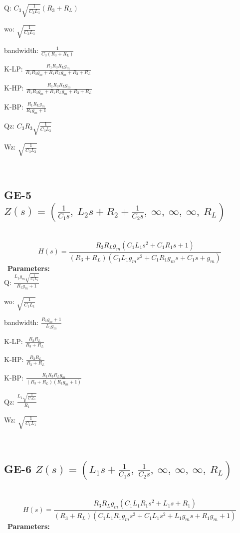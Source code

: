 \documentclass{article}
\begin{document}
Q: $C_{3} \sqrt{\frac{1}{C_{3} L_{3}}} \left(R_{3} + R_{L}\right)$\ 

wo: $\sqrt{\frac{1}{C_{3} L_{3}}}$\ 

bandwidth: $\frac{1}{C_{3} \left(R_{3} + R_{L}\right)}$\ 

K-LP: $\frac{R_{1} R_{3} R_{L} g_{m}}{R_{1} R_{3} g_{m} + R_{1} R_{L} g_{m} + R_{3} + R_{L}}$\ 

K-HP: $\frac{R_{1} R_{3} R_{L} g_{m}}{R_{1} R_{3} g_{m} + R_{1} R_{L} g_{m} + R_{3} + R_{L}}$\ 

K-BP: $\frac{R_{1} R_{L} g_{m}}{R_{1} g_{m} + 1}$\ 

Qz: $C_{3} R_{3} \sqrt{\frac{1}{C_{3} L_{3}}}$\ 

Wz: $\sqrt{\frac{1}{C_{3} L_{3}}}$\ 

\ 

\subsection{GE-5 $Z(s) = \left( \frac{1}{C_{1} s}, \  L_{2} s + R_{2} + \frac{1}{C_{2} s}, \  \infty, \  \infty, \  \infty, \  R_{L}\right)$ } \ 
\textbf{\[H(s) = \frac{R_{3} R_{L} g_{m} \left(C_{1} L_{1} s^{2} + C_{1} R_{1} s + 1\right)}{\left(R_{3} + R_{L}\right) \left(C_{1} L_{1} g_{m} s^{2} + C_{1} R_{1} g_{m} s + C_{1} s + g_{m}\right)}\] } \ 
\textbf{Parameters:}\\ 

Q: $\frac{L_{1} g_{m} \sqrt{\frac{1}{C_{1} L_{1}}}}{R_{1} g_{m} + 1}$\ 

wo: $\sqrt{\frac{1}{C_{1} L_{1}}}$\ 

bandwidth: $\frac{R_{1} g_{m} + 1}{L_{1} g_{m}}$\ 

K-LP: $\frac{R_{3} R_{L}}{R_{3} + R_{L}}$\ 

K-HP: $\frac{R_{3} R_{L}}{R_{3} + R_{L}}$\ 

K-BP: $\frac{R_{1} R_{3} R_{L} g_{m}}{\left(R_{3} + R_{L}\right) \left(R_{1} g_{m} + 1\right)}$\ 

Qz: $\frac{L_{1} \sqrt{\frac{1}{C_{1} L_{1}}}}{R_{1}}$\ 

Wz: $\sqrt{\frac{1}{C_{1} L_{1}}}$\ 

\ 

\subsection{GE-6 $Z(s) = \left( L_{1} s + \frac{1}{C_{1} s}, \  \frac{1}{C_{2} s}, \  \infty, \  \infty, \  \infty, \  R_{L}\right)$ } \ 
\textbf{\[H(s) = \frac{R_{3} R_{L} g_{m} \left(C_{1} L_{1} R_{1} s^{2} + L_{1} s + R_{1}\right)}{\left(R_{3} + R_{L}\right) \left(C_{1} L_{1} R_{1} g_{m} s^{2} + C_{1} L_{1} s^{2} + L_{1} g_{m} s + R_{1} g_{m} + 1\right)}\] } \ 
\textbf{Parameters:}\\ 
\end{document}
